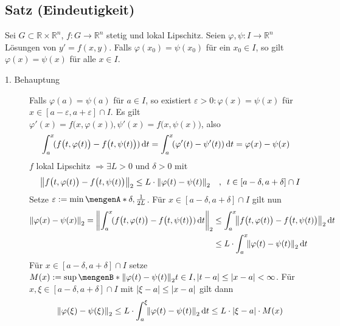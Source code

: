 \subsection[Satz: Eindeutigkeit von Lösungen, wenn $f$ lokal Lipschitz]{Satz (Eindeutigkeit)} %
\label{sub:16}
Sei $G \subset \mathds{R} \times \mathds{R}^n$, $f :G  \to \mathds{R}^n$ stetig und lokal Lipschitz. Seien $\varphi, \psi : I \to \mathds{R}^n$ Lösungen von $y'= f(x,y)$.
Falls $\varphi(x_0)= \psi(x_0)$ für ein $x_0 \in I$, so gilt $\varphi(x)= \psi(x)$ für alle $x \in I$.
\begin{description}
	\item[1. Behauptung] Falls $\varphi(a)= \psi(a)$ für $a \in I$, so existiert $\varepsilon >0 : \varphi(x)= \psi (x)$ für $x \in [a- \varepsilon, a+\varepsilon]\cap I$.
	Es gilt $\varphi'(x)= f\big(x, \varphi(x)\big), \psi'(x)= f\big(x,\psi(x)\big)$, also 
	\begin{align*}
		\int_{a} ^{x} \! ( f\big(t,\varphi(t)\big) - f\big(t,\psi(t)\big))  \, \mathrm{d}t &= \int_{a} ^{x} \! (\varphi'(t) - \psi'(t))  \, \mathrm{d}t = \varphi(x)-\psi(x) 
	\end{align*}
	$f$ lokal Lipschitz $\Rightarrow \exists L >0$ und $\delta >0$ mit 
	\begin{align*}
		\norm[2]{f\big(t, \varphi(t) \big) - f\big(t, \psi(t)\big)} \le L \cdot \norm[2]{ \varphi(t) - \psi(t) }  \quad, \enspace t \in [a- \delta , a+ \delta ]\cap I
	\end{align*} 
	Setze $\varepsilon := \min \set{\delta , \frac{1}{2 L} } $. Für $x \in  [a- \delta , a+ \delta ] \cap I$ gilt nun
	\begin{align*}
		\norm[2]{\varphi(x)- \psi(x)} = \norm[2]{\int_{a} ^{x} \! \enbrace{f\big(t, \varphi(t)\big) - f\big(t, \psi(t)\big)}  \, \mathrm{d}t} &\le \int_{a} ^{x} \! 
		\norm[2]{f\big(t, \varphi(t)\big) - f\big(t, \psi(t)\big)}  \, \mathrm{d}t \\
		&\le L \cdot \int_{a} ^{x} \! \norm[2]{\varphi(t)- \psi(t)}  \, \mathrm{d}t 
	\end{align*}
	Für $x \in [a- \delta , a+ \delta ] \cap I$ setze $M(x) := \sup \set[{\norm[2]{\varphi(t)- \psi(t)}}]{t \in I, \abs{t-a}\le \abs{x-a}  } < \infty  $.
	Für $x, \xi \in [a-\delta , a+\delta ] \cap I$ mit $\lvert\xi-a\rvert\le \lvert x-a\rvert  $ gilt dann 
	\begin{align*}
		\norm[2]{\varphi(\xi) - \psi(\xi)} \le L \cdot \int_{a} ^{\xi} \!  \norm[2]{\varphi(t)- \psi(t)}  \, \mathrm{d}t \le L \cdot \abs{\xi -a}\cdot M(x) 

\end{align*}
\end{description}
